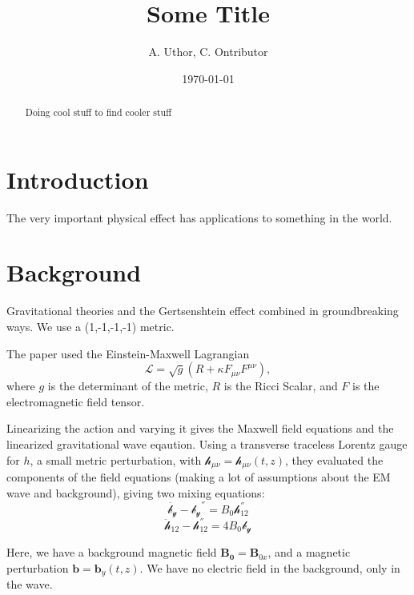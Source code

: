 \documentclass[letterpaper,12pt]{article}
\begin{document}
\title{Some Title}
\author{A. Uthor, C. Ontributor}
\date{\today}
\maketitle

\begin{abstract}
Doing cool stuff to find cooler stuff
\end{abstract}


\section{Introduction}

The very important physical effect has applications to something in the world. 


\section{Background}

Gravitational theories and the Gertsenshtein effect combined in groundbreaking ways.
We use a (1,-1,-1,-1) metric.

The paper used the Einstein-Maxwell Lagrangian
\begin{equation}
\mathcal{L}=\sqrt{g}(R+\kappa F_{\mu \nu}F^{\mu \nu}),
\end{equation}
where $g$ is the determinant of the metric, $R$ is the Ricci Scalar, and $F$ is the electromagnetic field tensor. 

Linearizing the action and varying it gives the Maxwell field equations and the linearized gravitational wave eqaution. Using a transverse traceless Lorentz gauge for $h$, a small metric perturbation, with $\mathcal{h}_{\mu \nu}=\mathcal{h}_{\mu \nu}(t,z)$, they evaluated the components of the field equations (making a lot of assumptions about the EM wave and background), giving two mixing equations:
\begin{equation}
\ddot{ \mathcal{b_y}} - \mathcal{b_y}^{''}=B_0\mathcal{h}^{''}_{12}
\end{equation}
\begin{equation}
\ddot{ \mathcal{h}}_{12} - \mathcal{h}^{''}_{12}=4B_0 \mathcal{b_y}
\end{equation}

Here, we have a background magnetic field $\mathbf{B_0}=\mathbf{B}_{0x}$, and a magnetic perturbation $\mathbf{b}=\mathbf{b}_y (t,z)$. We have no electric field in the background, only in the wave.
\end{document}

